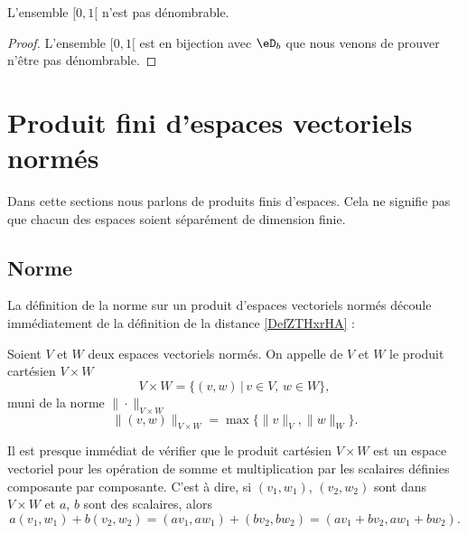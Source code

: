 \begin{corollary}
    L'ensemble \( \mathopen[ 0 , 1 [\) n'est pas dénombrable.
\end{corollary}

\begin{proof}
    L'ensemble \( \mathopen[ 0 , 1 [\) est en bijection avec \( \eD_b\) que nous venons de prouver n'être pas dénombrable.
\end{proof}

\section{Produit fini d'espaces vectoriels normés}
\label{sec_prod}

Dans cette sections nous parlons de produits finis d'espaces. Cela ne signifie pas que chacun des espaces soient séparément de dimension finie.

\subsection{Norme}

La définition de la norme sur un produit d'espaces vectoriels normés découle immédiatement de la définition de la distance \ref{DefZTHxrHA} :
\begin{definition}  \label{DefFAJgTCE}
    Soient $V$ et $W$ deux espaces vectoriels normés. On appelle  de $V$ et $W$ le produit cartésien $V\times W$ 
    \begin{equation}
    V\times W=\{(v,w)\,|\, v\in V,\, w\in W\},
    \end{equation}
    muni de la norme $\|\cdot \|_{V\times W}$
    \begin{equation}	\label{EqNormeVxWmax}
        \|(v,w) \|_{V\times W}=\max\{\|v\|_{V},\|w\|_W\}.
    \end{equation}
\end{definition}
Il est presque immédiat de vérifier que le produit cartésien $V\times W$ est un espace vectoriel pour les opération de somme et multiplication par les scalaires définies composante par composante. C'est à dire,  si $(v_1,w_1)$, $(v_2,w_2)$ sont dans $V\times W$ et $a$, $b$ sont des scalaires, alors  
\begin{equation}
 a (v_1,w_1)+ b(v_2,w_2)=(av_1,aw_1)+ (bv_2,bw_2)=(av_1+bv_2,aw_1+bw_2).
\end{equation}

